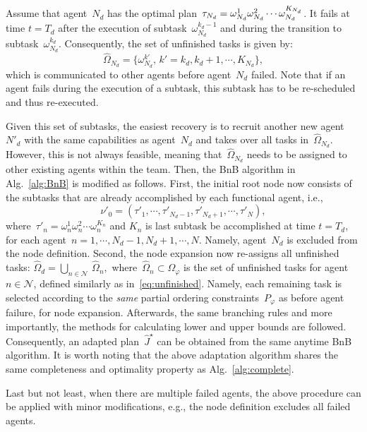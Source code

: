 Assume that agent~$N_d$ has the optimal
plan~$\tau_{N_d}=\omega^1_{N_d}\omega^2_{N_d}\\\cdots \omega^{K_{N_d}}_{N_d}$.
It fails at time $t=T_d$ after the execution of subtask~$\omega^{k_d-1}_{N_d}$ and during the
transition to subtask~$\omega^{k_d}_{N_d}$.
Consequently, the set of unfinished tasks is given by:
\begin{equation}\label{eq:unfinished}
\widehat{\Omega}_{N_d}=\{\omega^{k'}_{N_d},\,k'=k_d,k_d+1,\cdots,K_{N_d}\},
\end{equation}
which is communicated to other agents before agent~$N_d$ failed.
Note that if an agent fails during the execution of a subtask,
this subtask has to be re-scheduled and thus re-executed.



Given this set of subtasks, the easiest recovery is to recruit another new
agent~$N'_d$ with the same capabilities as agent~$N_d$ and
takes over all tasks in~$\widehat{\Omega}_{N_d}$.
However, this is not always feasible, meaning that~$\widehat{\Omega}_{N_d}$ needs to
be assigned to other existing agents within the team.
Then, the BnB algorithm in Alg.~\ref{alg:BnB} is modified as follows.
First, the initial root node now consists of the subtasks that are already
accomplished by each functional agent, i.e.,
\begin{equation}\label{eq:new-initial}
  \nu'_0=(\tau'_1,\cdots,\tau'_{N_d-1},\tau'_{N_d+1},\cdots,\tau'_{N}),
\end{equation}
where~$\tau'_n=\omega^1_n \omega^2_n\cdots \omega^{K_n}_n$ and $K_n$ is last
subtask be accomplished at time $t=T_d$,
for each agent~$n=1,\cdots,N_d-1,N_d+1,\cdots,N$.
Namely, agent~$N_d$ is excluded from the node definition.
Second, the node expansion now re-assigns all unfinished tasks:
$
  \widehat{\Omega}_d= \bigcup_{n\in \mathcal{N}}\,\widehat{\Omega}_n,
$
where~$\widehat{\Omega}_n\subset \Omega_{\varphi}$ is the set of unfinished tasks
for agent~$n\in \mathcal{N}$, defined similarly as in~\eqref{eq:unfinished}.
Namely, each remaining task is selected according to the \emph{same} partial
ordering constraints~$P_{\varphi}$ as before agent failure, for node expansion.
Afterwards, the same branching rules and more importantly,
the methods for calculating lower and upper bounds are followed.
Consequently, an adapted plan~$\widehat{J}^\star$ can be obtained
from the same anytime BnB algorithm.
It is worth noting that the above adaptation algorithm shares the same
completeness and optimality property as Alg.~\ref{alg:complete}.

Last but not least, when there are multiple failed agents, the above procedure
can be applied with minor modifications, e.g., the node definition excludes
all failed agents.
